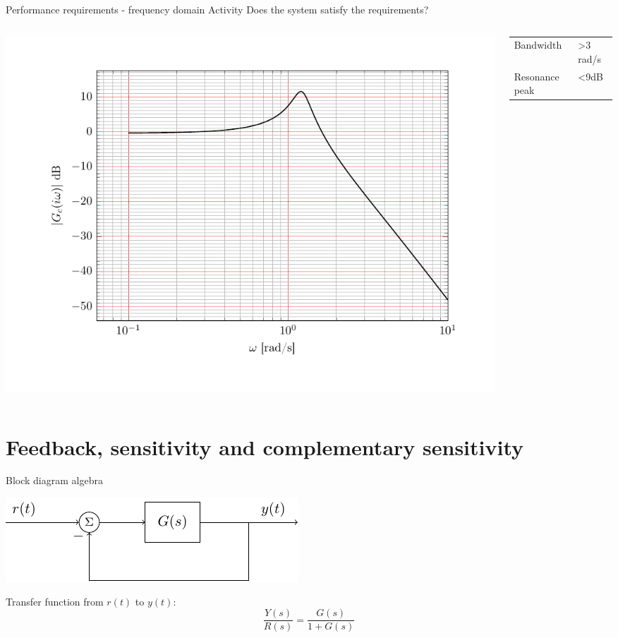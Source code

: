 \documentclass[presentation,aspectratio=169, usenames, dvipsnames]{beamer}
\begin{document}
\begin{frame}[label={sec:org37174b6}]{Performance requirements - frequency domain}
\alert{Activity} Does the system satisfy the requirements?


\begin{columns}
\begin{column}{0.7\columnwidth}
\begin{center}
 \includegraphics[width=1.0\linewidth]{../../figures/bode-closed-loop-example}
\end{center}
\end{column}
\begin{column}{0.3\columnwidth}
\begin{center}
\begin{tabular}{ll}
Bandwidth & >3 rad/s\\
Resonance peak & <9dB\\
\end{tabular}
\end{center}
\end{column}
\end{columns}
\end{frame}




\section{Feedback, sensitivity and complementary sensitivity}
\label{sec:org4454ec2}

\begin{frame}[label={sec:orga1227ac}]{Block diagram algebra}
\begin{center}
  \includegraphics[width=.6\linewidth]{../../figures/block-simple-feedback}
\end{center}

Transfer function from \(r(t)\) to \(y(t)\):
\[ \frac{Y(s)}{R(s)} = \frac{G(s)}{ 1+ G(s)}\]
\end{frame}
\end{document}
